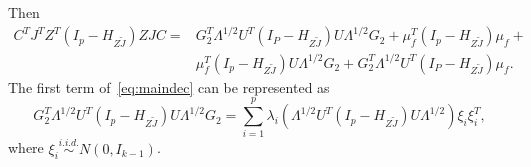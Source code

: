\documentclass[review]{elsarticle}
\theoremstyle{plain}
\theoremstyle{definition}
\theoremstyle{remark}
\begin{document}
Then 
\begin{equation}\label{eq:maindec}
\begin{aligned}
C^TJ^T Z^T(I_p-H_{Z\tilde J}) ZJC
=&
G_2^T \Lambda^{1/2}U^T (I_P-H_{Z\tilde{J}})U\Lambda^{1/2}G_2+
\mu_f^T (I_p -H_{Z\tilde{J}})\mu_f+\\
&\mu_f^T (I_p -H_{Z\tilde{J}})U\Lambda^{1/2}G_2+
G_2^T \Lambda^{1/2}U^T (I_P-H_{Z\tilde{J}})\mu_f.
\end{aligned}
\end{equation}
    The first term of~\eqref{eq:maindec} can be represented as
\begin{equation}\label{eq:firstTerm}
G_2^T \Lambda^{1/2}U^T (I_p-H_{Z\tilde{J}})U\Lambda^{1/2}G_2=
\sum_{i=1}^p \lambda_i (\Lambda^{1/2}U^T (I_p-H_{Z\tilde{J}})U\Lambda^{1/2})\xi_i \xi_i^T,
\end{equation}
where $\xi_i\overset{i.i.d.}{\sim} N(0,I_{k-1})$.
\end{document}
